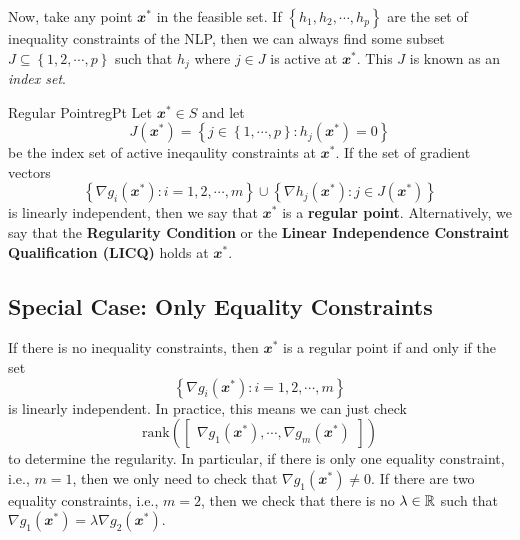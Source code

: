 \documentclass[math, code]{amznotes}
\theoremstyle{remark}
\begin{document}
Now, take any point $\mathbfit{x}^*$ in the feasible set. If $\left\{h_1, h_2, \cdots, h_p\right\}$ are the set of inequality constraints of the NLP, then we can always find some subset $J \subseteq \left\{1, 2, \cdots, p\right\}$ such that $h_j$ where $j \in J$ is active at $\mathbfit{x}^*$. This $J$ is known as an \textit{index set}.
\begin{dfnbox}{Regular Point}{regPt}
    Let $\mathbfit{x}^* \in S$ and let
    \begin{equation*}
        J(\mathbfit{x}^*) = \left\{j \in \left\{1, \cdots, p\right\} \colon h_j(\mathbfit{x}^*) = 0\right\}
    \end{equation*}
    be the index set of active ineqaulity constraints at $
    \mathbfit{x}^*$. If the set of gradient vectors
    \begin{equation*}
        \left\{\nabla g_i(\mathbfit{x}^*) \colon i = 1, 2, \cdots, m\right\} \cup \left\{\nabla h_j(\mathbfit{x}^*) \colon j \in J(\mathbfit{x}^*)\right\}
    \end{equation*}
    is linearly independent, then we say that $\mathbfit{x}^*$ is a {\color{red} \textbf{regular point}}. Alternatively, we say that the {\color{red} \textbf{Regularity Condition}} or the {\color{red} \textbf{Linear Independence Constraint Qualification (LICQ)}} holds at $\mathbfit{x}^*$.
\end{dfnbox}

\subsection{Special Case: Only Equality Constraints}
If there is no inequality constraints, then $\mathbfit{x}^*$ is a regular point if and only if the set 
\begin{equation*}
    \left\{\nabla g_i(\mathbfit{x}^*) \colon i = 1, 2, \cdots, m\right\}
\end{equation*}
is linearly independent. In practice, this means we can just check 
\begin{equation*}
    \mathrm{rank}\left(\begin{bmatrix}
        \nabla g_1(\mathbfit{x}^*), \cdots, \nabla g_m(\mathbfit{x}^*)
    \end{bmatrix}\right)
\end{equation*}
to determine the regularity. In particular, if there is only one equality constraint, i.e., $m = 1$, then we only need to check that $\nabla g_1(\mathbfit{x}^*) \neq \mathbfit{0}$. If there are two equality constraints, i.e., $m = 2$, then we check that there is no $\lambda \in \mathbb{R}$ such that $\nabla g_1(\mathbfit{x}^*) = \lambda \nabla g_2(\mathbfit{x}^*)$.
\end{document}
